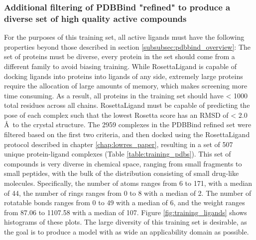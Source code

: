 \subsubsection{Additional filtering of PDBBind "refined" to produce a diverse set of high quality active compounds}
\label{subsubsec:active_poses}
For the purposes of this training set, all active ligands must have the following properties beyond those described in section \ref{subsubsec:pdbbind_overview}:
The set of proteins must be diverse, every protein in the set should come from a different family to avoid biasing training.
While RosettaLigand is capable of docking ligands into proteins into ligands of any side, extremely large proteins require the allocation of large amounts of memory, which makes screening more time consuming.
As a result, all proteins in the training set should have < 1000 total residues across all chains.
RosettaLigand must be capable of predicting the pose of each complex such that the lowest Rosetta score has an \ac{RMSD} of < 2.0 \AA\ to the crystal structure.
The 2959 complexes in the PDBBind refined set were filtered based on the first two criteria, and then docked using the RosettaLigand protocol described in chapter \ref{chap:lowres_paper}, resulting in a set of 507 unique protein-ligand complexes (Table \ref{table:training_pdbs}). 
This set of compounds is very diverse in chemical space, ranging from small fragments to small peptides, with the bulk of the distribution consisting of small drug-like molecules.
Specifically, the number of atoms ranges from 6 to 171, with a median of 44, the number of rings ranges from 0 to 8 with a median of 2. The number of rotatable bonds ranges from 0 to 49 with a median of 6, and the weight ranges from 87.06 to 1107.58 with a median of 107.
Figure \ref{fig:training_ligands} shows histograms of these plots.
The large diversity of this training set is desirable, as the goal is to produce a model with as wide an applicability domain as possible.

